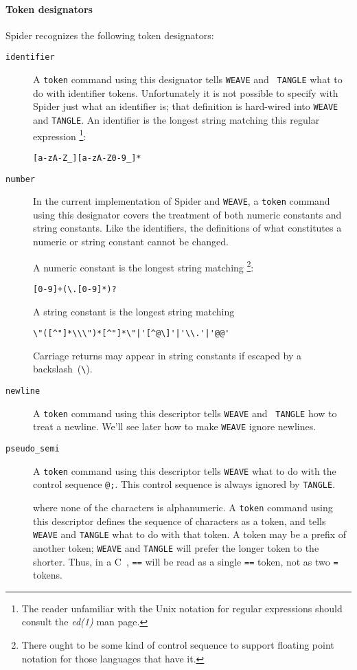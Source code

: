\paragraph{Token designators}
{Spider} recognizes the following token designators:
\begin{description}
\item[{\tt identifier}]
A {\tt token} command using this designator tells {\tt WEAVE} and {\tt
TANGLE} what to do with identifier tokens.
Unfortunately it is not possible to specify with {Spider} just
what an identifier is; that definition is hard-wired into {\tt WEAVE}
and {\tt TANGLE}.
An identifier is the longest string matching this regular expression%
\footnote{The reader unfamiliar with the Unix notation for regular
expressions should consult the {\it ed(1)} man page.}:
\begin{verbatim}
[a-zA-Z_][a-zA-Z0-9_]*
\end{verbatim}

\item[{\tt number}]
In the current implementation of {Spider} and {\tt WEAVE}, a {\tt token}
command using this designator covers the treatment of both numeric
constants and string constants.
Like the identifiers, the definitions of what constitutes a numeric or
string constant cannot be changed.
{\samepage
A numeric constant is the longest string matching%
\footnote{There  ought to be some kind of {\WEB} control sequence to
support floating point notation for those languages that have it.}:
\begin{verbatim}
[0-9]+(\.[0-9]*)?
\end{verbatim}
}
A string constant is the longest string matching
\begin{verbatim}
\"([^"]*\\\")*[^"]*\"|'[^@\]'|'\\.'|'@@'
\end{verbatim}
Carriage returns may appear in string constants if escaped by a
backslash~(\verb+\+).

\item[{\tt newline}]
A {\tt token} command using this descriptor tells {\tt WEAVE} and {\tt
TANGLE} how to treat a newline.
We'll see later how to make {\tt WEAVE} ignore newlines.

\item[{\tt pseudo\_semi}]
A {\tt token} command using this descriptor tells {\tt WEAVE} what to
do with the {\WEB} control sequence {\tt @;}.
This control sequence is always ignored by {\tt TANGLE}.

\item[]
where none of the characters is alphanumeric.
A {\tt token} command using this descriptor defines the sequence of
characters as a token, and tells {\tt WEAVE} and {\tt TANGLE} what to
do with that token.
A token may be a prefix of another token; {\tt WEAVE} and {\tt TANGLE}
will prefer the longer token to the shorter.
Thus, in a C~{\WEB}, \verb+==+ will be read as a single \verb+==+
token, not as two \verb+=+ tokens.
\end{description}




